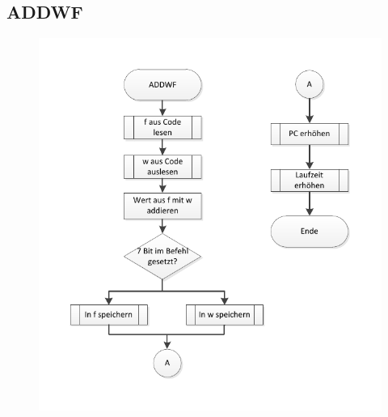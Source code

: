 \newpage
\subsection{ADDWF}



\begin{figure}[h]
\centering
\includegraphics[scale=0.7]{Diag/ADDWF.pdf}
\end{figure}
